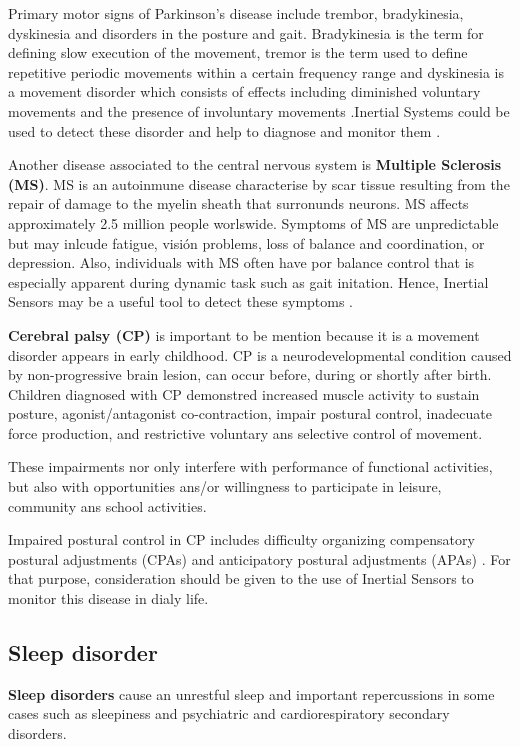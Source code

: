 Primary motor signs of Parkinson’s disease include trembor, bradykinesia, dyskinesia and disorders in the posture and gait. Bradykinesia is the term for defining slow execution of the movement, tremor is the term used to define repetitive periodic movements within a certain frequency range and dyskinesia is a movement disorder which consists of effects including diminished voluntary movements and the presence of involuntary movements .Inertial Systems could be used to detect these disorder and help to diagnose and monitor them \cite{A.Olivares2013}.

Another disease associated to the central nervous system is \textbf{Multiple Sclerosis (MS)}. MS is an autoinmune disease characterise by scar tissue resulting from the repair of damage to the myelin sheath that surronunds neurons. MS affects approximately 2.5 million people worlswide. Symptoms of MS are unpredictable but may inlcude fatigue, visión problems, loss of balance and coordination, or depression. Also, individuals with MS often have por balance control that is especially apparent during dynamic task such as gait initation. Hence, Inertial Sensors may be a useful tool to detect these symptoms \cite{Jebb2008}.


\textbf{Cerebral  palsy (CP)} is important to be mention  because it is a movement disorder appears in early childhood. CP is a neurodevelopmental condition caused by non-progressive brain lesion, can occur before, during or shortly after birth. Children diagnosed with CP demonstred increased muscle activity to sustain posture, agonist/antagonist co-contraction, impair postural control, inadecuate force production, and restrictive voluntary ans selective control of movement\cite{Gay2011}.

These impairments nor only interfere with performance of functional activities, but also with opportunities  ans/or willingness to participate in leisure, community ans school activities.

Impaired postural control in CP includes difficulty organizing compensatory postural adjustments (CPAs) and anticipatory postural adjustments (APAs) \cite{Gay2011}. For that purpose,  consideration should be given to the use of Inertial Sensors to monitor this disease in dialy life.

\subsection{Sleep disorder}
\textbf{Sleep disorders} cause an unrestful sleep and important repercussions in some cases such as sleepiness and psychiatric and cardiorespiratory secondary disorders\cite{SanchezDaniel}. 

